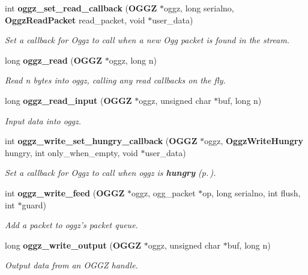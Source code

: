 \begin{CompactItemize}
int {\bf oggz\_\-set\_\-read\_\-callback} ({\bf OGGZ} $\ast$oggz, long serialno, {\bf Oggz\-Read\-Packet} read\_\-packet, void $\ast$user\_\-data)
\begin{CompactList}\small\item\em Set a callback for Oggz to call when a new Ogg packet is found in the stream. \item\end{CompactList}\item 
long {\bf oggz\_\-read} ({\bf OGGZ} $\ast$oggz, long n)
\begin{CompactList}\small\item\em Read n bytes into {\em oggz\/}, calling any read callbacks on the fly. \item\end{CompactList}\item 
long {\bf oggz\_\-read\_\-input} ({\bf OGGZ} $\ast$oggz, unsigned char $\ast$buf, long n)
\begin{CompactList}\small\item\em Input data into {\em oggz\/}. \item\end{CompactList}\item 
int {\bf oggz\_\-write\_\-set\_\-hungry\_\-callback} ({\bf OGGZ} $\ast$oggz, {\bf Oggz\-Write\-Hungry} hungry, int only\_\-when\_\-empty, void $\ast$user\_\-data)
\begin{CompactList}\small\item\em Set a callback for Oggz to call when {\em oggz\/} is {\bf hungry }{\rm (p.\,\pageref{group__hungry})}. \item\end{CompactList}\item 
int {\bf oggz\_\-write\_\-feed} ({\bf OGGZ} $\ast$oggz, ogg\_\-packet $\ast$op, long serialno, int flush, int $\ast$guard)
\begin{CompactList}\small\item\em Add a packet to {\em oggz's\/} packet queue. \item\end{CompactList}\item 
long {\bf oggz\_\-write\_\-output} ({\bf OGGZ} $\ast$oggz, unsigned char $\ast$buf, long n)
\begin{CompactList}\small\item\em Output data from an OGGZ handle. \item\end{CompactList}\item 

\end{CompactItemize}
